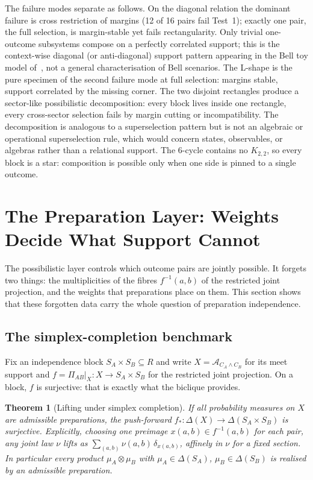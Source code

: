 \documentclass[11pt,a4paper]{article}
\newtheorem{theorem}{Theorem}[section]
\newcommand{\AC}[1]{\mathcal{A}_{#1}}
\newcommand{\PiAB}{\Pi_{AB}}
\begin{document}
    The failure modes separate as follows.
    On the diagonal relation the dominant failure is cross restriction of margins (12 of 16 pairs fail
    Test~1); exactly one pair, the full selection, is margin-stable yet fails rectangularity.
    Only trivial one-outcome subsystems compose on a perfectly correlated support; this is the context-wise
    diagonal (or anti-diagonal) support pattern appearing in the Bell toy model of~\cite{Beau2026b}, not a
    general characterisation of Bell scenarios.
    The L-shape is the pure specimen of the second failure mode at full selection: margins stable, support
    correlated by the missing corner.
    The two disjoint rectangles produce a sector-like possibilistic decomposition: every block lives inside
    one rectangle, every cross-sector selection fails by margin cutting or incompatibility.
    The decomposition is analogous to a superselection pattern but is not an algebraic or operational
    superselection rule, which would concern states, observables, or algebras rather than a relational
    support.
    The 6-cycle contains no $K_{2,2}$, so every block is a star: composition is possible only when one side
    is pinned to a single outcome.

  \section{The Preparation Layer: Weights Decide What Support
  \texorpdfstring{\mbox{Cannot}}{Cannot}}
  \label{sec:preparation}

    The possibilistic layer controls which outcome pairs are jointly possible.
    It forgets two things: the multiplicities of the fibres $f^{-1}(a,b)$ of the restricted joint
    projection, and the weights that preparations place on them.
    This section shows that these forgotten data carry the whole question of preparation independence.

  \subsection{The simplex-completion benchmark}
    \label{ssec:benchmark}

    Fix an independence block $S_A \times S_B \subseteq R$ and write $X = \AC{C_A \wedge C_B}$ for its meet
    support and $f = \PiAB|_X \colon X \to S_A \times S_B$ for the restricted joint projection.
    On a block, $f$ is surjective: that is exactly what the biclique provides.

    \begin{theorem}[Lifting under simplex completion]
      \label{thm:lifting}
      If all probability measures on $X$ are admissible preparations, the push-forward
      $f_* \colon \Delta(X) \to \Delta(S_A \times S_B)$ is surjective.
      Explicitly, choosing one preimage $x(a,b) \in f^{-1}(a,b)$ for each pair, any joint law $\nu$ lifts as
      $\sum_{(a,b)} \nu(a,b)\, \delta_{x(a,b)}$, affinely in $\nu$ for a fixed section.
      In particular every product $\mu_A \otimes \mu_B$ with $\mu_A \in \Delta(S_A)$,
      $\mu_B \in \Delta(S_B)$ is realised by an admissible preparation.
    \end{theorem}
\end{document}
